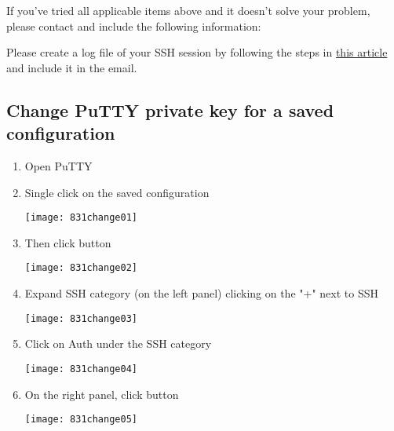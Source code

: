 \fi

If you've tried all applicable items above and it doesn't solve your problem,
please contact \hpcinfo and include the following information:

\ifwindows
Please create a log file of your SSH session by following the steps
in \href{https://my.kualo.com/knowledgebase/?kbcat=0&article=888}{this article}
and include it in the email.

\subsection{Change PuTTY private key for a saved configuration}
\label{subsec:putty-change-key}

\begin{enumerate}
    \item Open PuTTY

    \item Single click on the saved configuration

    \begin{center}
    \texttt{[image: 831change01]}
    \end{center}

    \item Then click  button

    \begin{center}
    \texttt{[image: 831change02]}
    \end{center}

    \item Expand SSH category (on the left panel) clicking on the "+" next to SSH

    \begin{center}
    \texttt{[image: 831change03]}
    \end{center}

    \item \label{item:putty-auth-ssh} \setcounter{puttyenum}{\value{enumi}} Click on Auth under the SSH category

    \begin{center}
    \texttt{[image: 831change04]}
    \end{center}

    \item On the right panel, click  button

    \begin{center}
    \texttt{[image: 831change05]}
    \end{center}


\end{enumerate}

